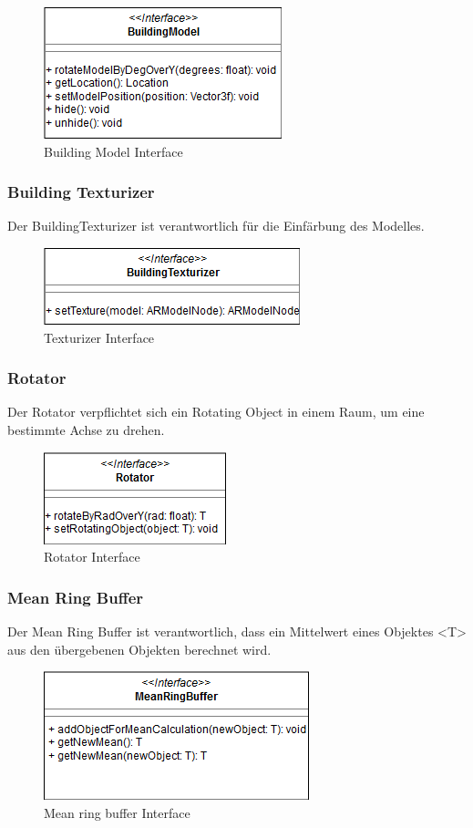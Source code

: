 \documentclass[a4paper]{scrreprt}
\begin{document}
\begin{figure}[h!]
	\center
	\includegraphics[scale=0.75]{BuildingModel.png}
	\caption{Building Model Interface}
\end{figure}

\subsubsection{Building Texturizer}
Der BuildingTexturizer ist verantwortlich für die Einfärbung des Modelles.
\begin{figure}[h!]
	\center
	\includegraphics[scale=0.75]{BuildingTexturizer.png}
	\caption{Texturizer Interface}
\end{figure}


\subsubsection{Rotator}
Der Rotator verpflichtet sich ein Rotating Object in einem Raum, um eine bestimmte Achse zu drehen.
\begin{figure}[h!]
	\center
	\includegraphics[scale=0.75]{Rotator.png}
	\caption{Rotator Interface}
\end{figure}


\subsubsection{Mean Ring Buffer}
Der Mean Ring Buffer ist verantwortlich, dass ein Mittelwert eines Objektes <T> aus den übergebenen Objekten berechnet wird.
\begin{figure}[h!]
	\center
	\includegraphics[scale=0.75]{MeanRingBuffer.png}
	\caption{Mean ring buffer Interface}
\end{figure}
\end{document}

